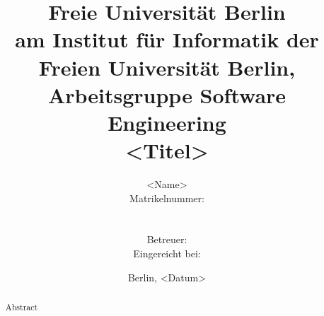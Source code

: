 \documentclass[11pt,a4paper,ngerman]{article}
\title{{\huge\bfseries Freie Universität Berlin}\\[2ex]
{\normalsize <X-Arbeit> am Institut für Informatik der Freien Universität 
Berlin, Arbeitsgruppe Software Engineering}\\[6ex]
<Titel>}
\author{<Name>\\
{\normalsize Matrikelnummer: }\\
{\normalsize \mailto{example@mail.de}}\\\\
{\normalsize Betreuer: }\\
{\normalsize Eingereicht bei: }}
\date{Berlin, <Datum>}
\begin{document}
\begin{titlepage}

\maketitle
\thispagestyle{empty}

\vfill{}

\begin{abstract}
Abstract
\end{abstract}

\vfill{}

\end{titlepage}

\pagestyle{empty}
\clearpage{}



\tableofcontents

\clearpage{}
\pagestyle{fancy}
\setcounter{page}{1}





\appendix




\end{document}
